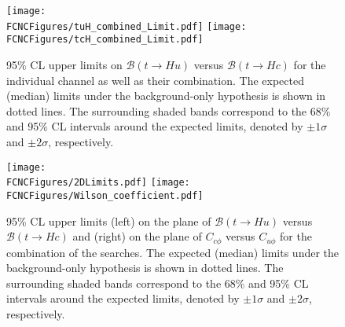 \begin{figure}[htb]
\centering
\texttt{[image: \\FCNCFigures/tuH\_combined\_Limit.pdf]}
\texttt{[image: \\FCNCFigures/tcH\_combined\_Limit.pdf]}
\caption{95\% CL upper limits on $\mathcal{B}(t\rightarrow Hu)$ versus $\mathcal{B}(t\rightarrow Hc)$ for the individual channel as well as their combination. %
The expected (median) limits under the background-only hypothesis is shown in dotted lines. The surrounding shaded bands correspond to the 68\% and 95\% CL
intervals around the expected limits, denoted by $\pm1\sigma$ and $\pm2\sigma$, respectively. }
\label{fig:combined_limit}
\end{figure}


\begin{figure}[htb]
\centering
\texttt{[image: \\FCNCFigures/2DLimits.pdf]}
\texttt{[image: \\FCNCFigures/Wilson\_coefficient.pdf]}
\caption{95\% CL upper limits (left) on the plane of $\mathcal{B}(t\rightarrow Hu)$ versus $\mathcal{B}(t\rightarrow Hc)$ and (right) on the plane of $C_{c\phi}$ versus $C_{u\phi}$ for the combination of the searches. The expected
(median) limits under the background-only hypothesis is shown in dotted lines. The surrounding shaded bands correspond to
the 68\% and 95\% CL intervals around the expected limits, denoted by $\pm1\sigma$ and $\pm2\sigma$, respectively.}
\label{fig:combined_2D_limit}
\end{figure}
